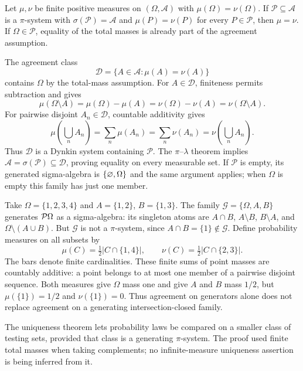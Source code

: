 \begin{theorem}
\label{thm:finite_measure_uniqueness}
Let $\mu,\nu$ be finite positive measures on
$(\Omega,\mathcal A)$ with $\mu(\Omega)=\nu(\Omega)$.
If $\mathcal P\subseteq\mathcal A$ is a $\pi$-system with
$\sigma(\mathcal P)=\mathcal A$ and
$\mu(P)=\nu(P)$ for every $P\in\mathcal P$, then $\mu=\nu$.
If $\Omega\in\mathcal P$, equality of the total masses is already
part of the agreement assumption.
\end{theorem}
\Proof
The agreement class
\[
\mathcal D=\{A\in\mathcal A:\mu(A)=\nu(A)\}
\]
contains $\Omega$ by the total-mass assumption. For $A\in\mathcal D$,
finiteness permits subtraction and gives
\[
\mu(\Omega\setminus A)=\mu(\Omega)-\mu(A)
=\nu(\Omega)-\nu(A)=\nu(\Omega\setminus A).
\]
For pairwise disjoint $A_n\in\mathcal D$, countable additivity gives
\[
\mu\left(\bigcup_nA_n\right)=\sum_n\mu(A_n)
=\sum_n\nu(A_n)=\nu\left(\bigcup_nA_n\right).
\]
Thus $\mathcal D$ is a Dynkin system containing $\mathcal P$.
The $\pi$--$\lambda$ theorem implies
$\mathcal A=\sigma(\mathcal P)\subseteq\mathcal D$, proving equality
on every measurable set. If $\mathcal P$ is empty, its generated
sigma-algebra is $\{\varnothing,\Omega\}$ and the same argument
applies; when $\Omega$ is empty this family has just one member.
\Done

\begin{example}
Take $\Omega=\{1,2,3,4\}$ and
$A=\{1,2\}$, $B=\{1,3\}$. The family
$\mathcal G=\{\Omega,A,B\}$ generates $\mathcal{P}\Omega$ as a
sigma-algebra: its singleton atoms are
$A\cap B$, $A\setminus B$, $B\setminus A$, and
$\Omega\setminus(A\cup B)$. But $\mathcal G$ is not a
$\pi$-system, since $A\cap B=\{1\}\notin\mathcal G$.
Define probability measures on all subsets by
\[
\mu(C)=\tfrac12|C\cap\{1,4\}|,\qquad
\nu(C)=\tfrac12|C\cap\{2,3\}|.
\]
The bars denote finite cardinalities. These finite sums of point masses are
countably additive: a point belongs to at most one member of a
pairwise disjoint sequence. Both measures give $\Omega$ mass one
and give $A$ and $B$ mass $1/2$, but
$\mu(\{1\})=1/2$ and $\nu(\{1\})=0$.
Thus agreement on generators alone does not replace agreement on a
generating intersection-closed family.
\end{example}

The uniqueness theorem lets probability laws be compared on a smaller
class of testing sets, provided that class is a generating $\pi$-system.
The proof used finite total masses when taking complements; no
infinite-measure uniqueness assertion is being inferred from it.

